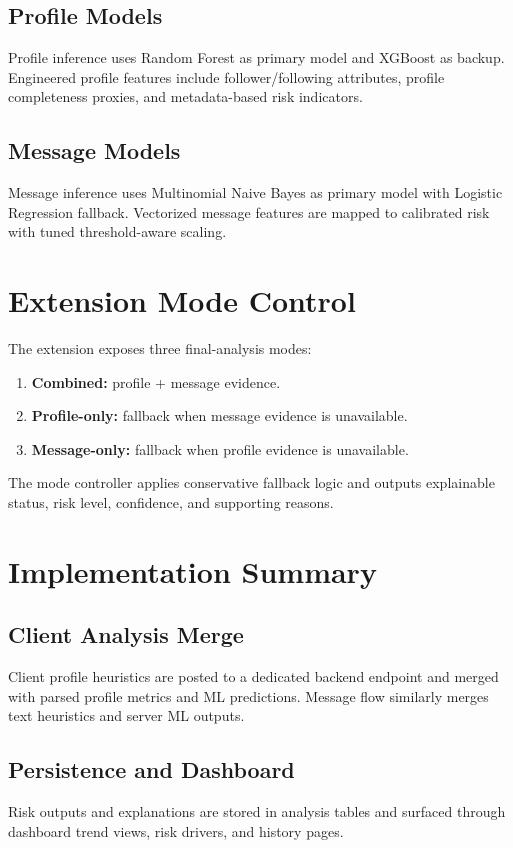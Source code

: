 ﻿\documentclass[conference]{IEEEtran}
\begin{document}
\subsection{Profile Models}
Profile inference uses Random Forest as primary model and XGBoost as backup. Engineered profile features include follower/following attributes, profile completeness proxies, and metadata-based risk indicators.

\subsection{Message Models}
Message inference uses Multinomial Naive Bayes as primary model with Logistic Regression fallback. Vectorized message features are mapped to calibrated risk with tuned threshold-aware scaling.

\section{Extension Mode Control}
The extension exposes three final-analysis modes:
\begin{enumerate}
\item \textbf{Combined:} profile + message evidence.
\item \textbf{Profile-only:} fallback when message evidence is unavailable.
\item \textbf{Message-only:} fallback when profile evidence is unavailable.
\end{enumerate}
The mode controller applies conservative fallback logic and outputs explainable status, risk level, confidence, and supporting reasons.

\section{Implementation Summary}
\subsection{Client Analysis Merge}
Client profile heuristics are posted to a dedicated backend endpoint and merged with parsed profile metrics and ML predictions. Message flow similarly merges text heuristics and server ML outputs.

\subsection{Persistence and Dashboard}
Risk outputs and explanations are stored in analysis tables and surfaced through dashboard trend views, risk drivers, and history pages.
\end{document}
